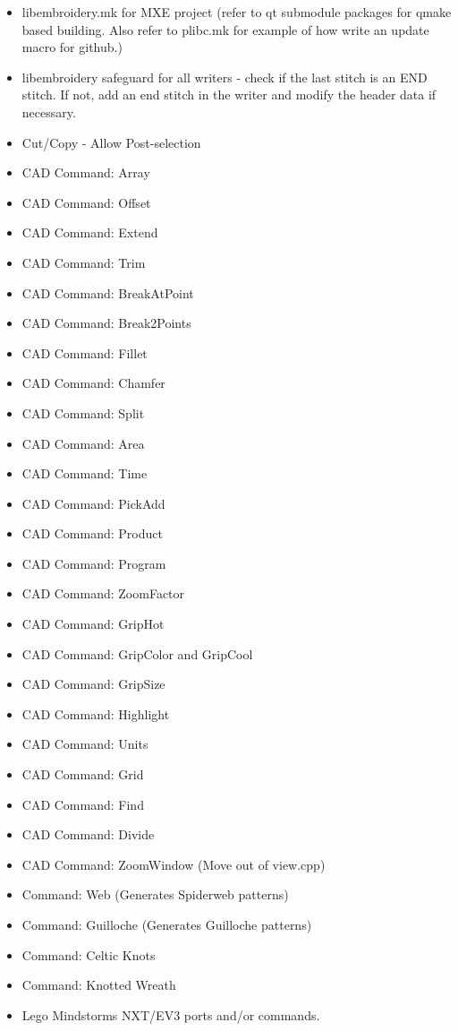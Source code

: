 \documentclass[10pt]{report}
\begin{document}
\begin{itemize}
\item libembroidery.mk for MXE project (refer to qt submodule packages for qmake based
    building. Also refer to plibc.mk for example of how write an update macro for
    github.)
\item libembroidery safeguard for all writers - check if the last stitch is an END
    stitch. If not, add an end stitch in the writer and modify the header data if
    necessary.
\item Cut/Copy - Allow Post-selection
\item CAD Command: Array
\item CAD Command: Offset
\item CAD Command: Extend
\item CAD Command: Trim
\item CAD Command: BreakAtPoint
\item CAD Command: Break2Points
\item CAD Command: Fillet
\item CAD Command: Chamfer
\item CAD Command: Split
\item CAD Command: Area
\item CAD Command: Time
\item CAD Command: PickAdd
\item CAD Command: Product
\item CAD Command: Program
\item CAD Command: ZoomFactor
\item CAD Command: GripHot
\item CAD Command: GripColor and GripCool
\item CAD Command: GripSize
\item CAD Command: Highlight
\item CAD Command: Units
\item CAD Command: Grid
\item CAD Command: Find
\item CAD Command: Divide
\item CAD Command: ZoomWindow (Move out of view.cpp)
\item Command: Web (Generates Spiderweb patterns)
\item Command: Guilloche (Generates Guilloche patterns)
\item Command: Celtic Knots
\item Command: Knotted Wreath
\item Lego Mindstorms NXT/EV3 ports and/or commands.

\end{itemize}
\end{document}

